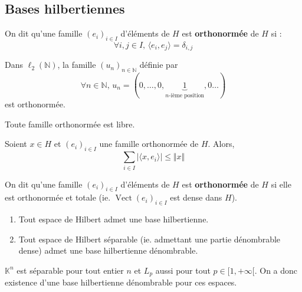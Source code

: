   \subsection{Bases hilbertiennes}


  \begin{definition}
    On dit qu'une famille $(e_i)_{i \in I}$ d'éléments de $H$ est \textbf{orthonormée} de $H$ si :
    \[ \forall i, j \in I, \, \langle e_i, e_j \rangle = \delta_{i,j} \]
  \end{definition}

  \begin{example}
    Dans $\ell_2(\mathbb{N})$, la famille $(u_n)_{n \in \mathbb{N}}$ définie par
    \[ \forall n \in \mathbb{N}, \, u_n = (0, \dots, 0, \underbrace{1}_{n \text{-ième position}}, 0 \dots) \]
    est orthonormée.
  \end{example}

  \begin{proposition}
    Toute famille orthonormée est libre.
  \end{proposition}

  \begin{proposition}
    Soient $x \in H$ et $(e_i)_{i \in I}$ une famille orthonormée de $H$. Alors,
    \[ \sum_{i \in I} \vert \langle x, e_i \rangle \vert \leq \Vert x \Vert \]
  \end{proposition}

  \begin{definition}
    On dit qu'une famille $(e_i)_{i \in I}$ d'éléments de $H$ est \textbf{orthonormée} de $H$ si elle est orthonormée et totale (ie. $\operatorname{Vect}(e_i)_{i \in I}$ est dense dans $H$).
  \end{definition}


  \begin{theorem}
    \begin{enumerate}[label=(\roman*)]
      \item Tout espace de Hilbert admet une base hilbertienne.
      \item Tout espace de Hilbert séparable (ie. admettant une partie dénombrable dense) admet une base hilbertienne dénombrable.
    \end{enumerate}
  \end{theorem}

  \begin{example}
    $\mathbb{K}^n$ est séparable pour tout entier $n$ et $L_p$ aussi pour tout $p \in [1,+\infty[$. On a donc existence d'une base hilbertienne dénombrable pour ces espaces.
  \end{example}

